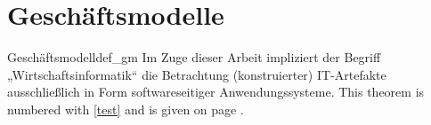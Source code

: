 \section{Geschäftsmodelle}


\begin{mydef}{Geschäftsmodell}{def_gm}
  Im Zuge dieser Arbeit impliziert der Begriff „Wirtschaftsinformatik“ die Betrachtung (konstruierter) IT-Artefakte ausschließlich in Form softwareseitiger Anwendungssysteme.
  This theorem is numbered with  \ref{test} and is given on page \pageref{test}.
\end{mydef}